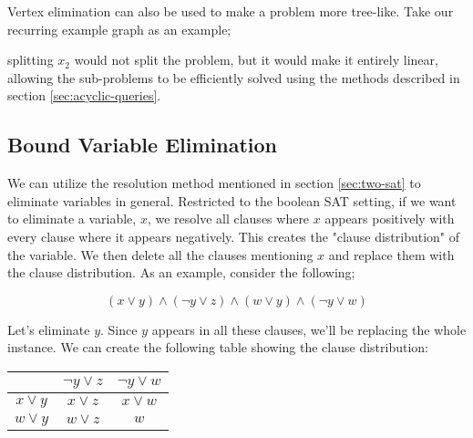 Vertex elimination can also be used to make a problem more tree-like. Take our recurring example graph as an example;

\begin{center}
\end{center}

splitting $x_2$ would not split the problem, but it would make it entirely linear, allowing the sub-problems to be efficiently solved using the methods described in section \ref{sec:acyclic-queries}.

\subsection{Bound Variable Elimination}\label{sec:var-elim}

We can utilize the resolution method mentioned in section \ref{sec:two-sat} to eliminate variables in general. Restricted to the boolean SAT setting, if we want to eliminate a variable, $x$, we resolve all clauses where $x$ appears positively with every clause where it appears negatively. This creates the "clause distribution" of the variable. We then delete all the clauses mentioning $x$ and replace them with the clause distribution. As an example, consider the following;

\begin{equation}
    (x \vee y) \wedge (\neg y \vee z) \wedge (w \vee y) \wedge (\neg y \vee w)
\end{equation}

Let's eliminate $y$. Since $y$ appears in all these clauses, we'll be replacing the whole instance. We can create the following table showing the clause distribution:

\begin{table}[h]
    \centering
    \begin{tabular}{c|c|c}
        & \( \neg y \vee z \) & \( \neg y \vee w \) \\
        \hline
        \( x \vee y \) & \( x \vee z \) & \( x \vee w \) \\
        \hline
        \( w \vee y \) & \( w \vee z \) & \( w \) \\
    \end{tabular}
    \label{tab:clause-distribution}
\end{table}

